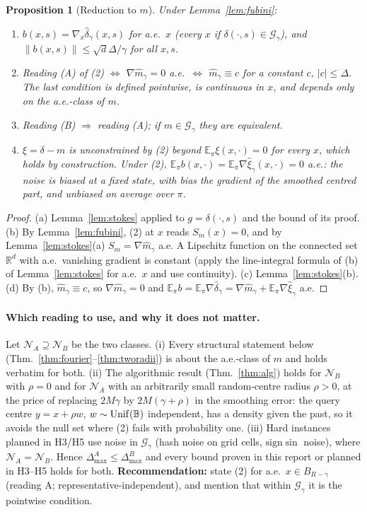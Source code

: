 \documentclass[11pt,a4paper]{article}
\numberwithin{equation}{section}
\newtheorem{proposition}[theorem]{Proposition}
\theoremstyle{definition}
\theoremstyle{remark}
\newcommand{\E}{\mathbb E}\newcommand{\R}{\mathbb R}\newcommand{\N}{\mathbb N}\newcommand{\Prob}{\mathbb P}
\newcommand{\norm}[1]{\lVert #1\rVert}\newcommand{\abs}[1]{\lvert #1\rvert}\newcommand{\ip}[2]{\langle #1,#2\rangle}
\newcommand{\Dmax}{\Delta_{\max}}\newcommand{\Dcp}{\Delta_{\rm cp}}
\newcommand{\cN}{\mathcal N}\newcommand{\cG}{\mathcal G}\newcommand{\cF}{\mathcal F}\newcommand{\cS}{\mathcal S}
\newcommand{\Unif}{\mathrm{Unif}}\newcommand{\TV}{\mathrm{TV}}\newcommand{\tmix}{t_{\rm mix}}
\begin{document}
\begin{proposition}[Reduction to $m$]\label{prop:reduction}
Under Lemma~\ref{lem:fubini}:
\begin{enumerate}[label=(\alph*)]
\item $b(x,s)=\nabla_x\hat\delta_\gamma(x,s)$ for a.e.\ $x$ (every $x$ if $\delta(\cdot,s)\in\cG_\gamma$), and $\norm{b(x,s)}\le\sqrt d\Delta/\gamma$ for all $x,s$.
\item Reading (A) of (2) $\iff$ $\nabla\hat m_\gamma=0$ a.e.\ $\iff$ $\hat m_\gamma\equiv c$ for a constant $c$, $\abs c\le\Delta$. The last condition is defined pointwise, is continuous in $x$, and depends only on the a.e.-class of $m$.
\item Reading (B) $\Rightarrow$ reading (A); if $m\in\cG_\gamma$ they are equivalent.
\item $\xi=\delta-m$ is unconstrained by (2) beyond $\E_\pi\xi(x,\cdot)=0$ for every $x$, which holds by construction. Under (2), $\E_\pi b(x,\cdot)=\E_\pi\nabla\hat\xi_\gamma(x,\cdot)=0$ a.e.: the noise is biased at a fixed state, with bias the gradient of the smoothed centred part, and unbiased on average over $\pi$.
\end{enumerate}
\end{proposition}
\begin{proof}
(a) Lemma~\ref{lem:stokes} applied to $g=\delta(\cdot,s)$ and the bound of its proof. (b) By Lemma~\ref{lem:fubini}, (2) at $x$ reads $S_m(x)=0$, and by Lemma~\ref{lem:stokes}(a) $S_m=\nabla\hat m_\gamma$ a.e. A Lipschitz function on the connected set $\R^d$ with a.e.\ vanishing gradient is constant (apply the line-integral formula of (b) of Lemma~\ref{lem:stokes} for a.e.\ $x$ and use continuity). (c) Lemma~\ref{lem:stokes}(b). (d) By (b), $\hat m_\gamma\equiv c$, so $\nabla\hat m_\gamma=0$ and $\E_\pi b=\E_\pi\nabla\hat\delta_\gamma=\nabla\hat m_\gamma+\E_\pi\nabla\hat\xi_\gamma$ a.e.
\end{proof}

\paragraph{Which reading to use, and why it does not matter.}
Let $\cN_A\supseteq\cN_B$ be the two classes. (i) Every structural statement below (Thm.~\ref{thm:fourier}--\ref{thm:tworadii}) is about the a.e.-class of $m$ and holds verbatim for both. (ii) The algorithmic result (Thm.~\ref{thm:alg}) holds for $\cN_B$ with $\rho=0$ and for $\cN_A$ with an arbitrarily small random-centre radius $\rho>0$, at the price of replacing $2M\gamma$ by $2M(\gamma+\rho)$ in the smoothing error: the query centre $y=x+\rho w$, $w\sim\Unif(\Ball)$ independent, has a density given the past, so it avoids the null set where (2) fails with probability one. (iii) Hard instances planned in H3/H5 use noise in $\cG_\gamma$ (hash noise on grid cells, $\mathrm{sign}\sin$ noise), where $\cN_A=\cN_B$. Hence $\Dmax^A\le\Dmax^B$ and every bound proven in this report or planned in H3--H5 holds for both.
\textbf{Recommendation:} state (2) for a.e.\ $x\in B_{R-\gamma}$ (reading A; representative-independent), and mention that within $\cG_\gamma$ it is the pointwise condition.
\end{document}
